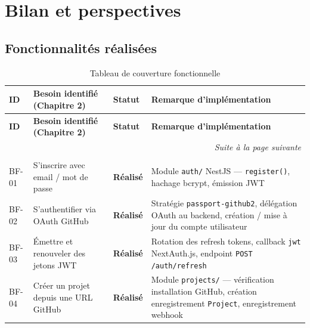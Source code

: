 \section{Bilan et perspectives}

\subsection{Fonctionnalités réalisées}

\begin{longtable}{|p{0.8cm}|p{5.5cm}|p{2.2cm}|p{4.5cm}|}
\caption{Tableau de couverture fonctionnelle}
\label{tab:functional-coverage} \\

\hline
\textbf{ID} & \textbf{Besoin identifié (Chapitre 2)} & \textbf{Statut} & \textbf{Remarque d'implémentation} \\
\hline
\endfirsthead

\hline
\textbf{ID} & \textbf{Besoin identifié (Chapitre 2)} & \textbf{Statut} & \textbf{Remarque d'implémentation} \\
\hline
\endhead

\hline
\multicolumn{4}{r|}{\small\textit{Suite à la page suivante}} \\
\endfoot

\hline
\endlastfoot

\multicolumn{4}{|l|}{\textbf{Besoins fonctionnels (BF)}} \\
\hline

BF-01
  & S'inscrire avec email / mot de passe
  & \textcolor{green!60!black}{\textbf{Réalisé}}
  & Module \texttt{auth/} NestJS — \texttt{register()}, hachage bcrypt, émission JWT \\
\hline

BF-02
  & S'authentifier via OAuth GitHub
  & \textcolor{green!60!black}{\textbf{Réalisé}}
  & Stratégie \texttt{passport-github2}, délégation OAuth au backend, création / mise à jour du compte utilisateur \\
\hline

BF-03
  & Émettre et renouveler des jetons JWT
  & \textcolor{green!60!black}{\textbf{Réalisé}}
  & Rotation des refresh tokens, callback \texttt{jwt} NextAuth.js, endpoint \texttt{POST /auth/refresh} \\
\hline

BF-04
  & Créer un projet depuis une URL GitHub
  & \textcolor{green!60!black}{\textbf{Réalisé}}
  & Module \texttt{projects/} — vérification installation GitHub, création enregistrement \texttt{Project}, enregistrement webhook \\
\hline


\end{longtable}
